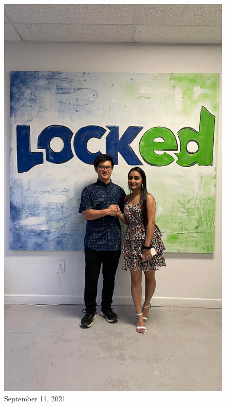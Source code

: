 \documentclass[
]{book}
\begin{document}
\begin{figure}
\centering
\includegraphics[width=5.20833in,height=\textheight]{mimages/13 9-11-2021.jpg}
\caption{September 11, 2021}
\end{figure}
\end{document}
